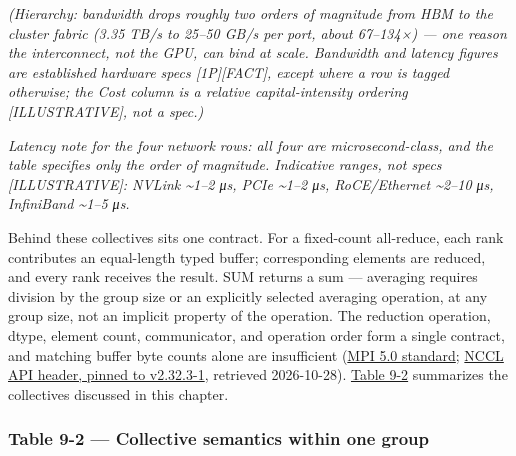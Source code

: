\emph{(Hierarchy: bandwidth drops roughly two orders of magnitude from
HBM to the cluster fabric (3.35 TB/s to 25--50 GB/s per port, about
67--134×) --- one reason the interconnect, not the GPU, can bind at
scale. Bandwidth and latency figures are established hardware specs
\mbox{{[}1P{]}}\hspace{0pt}\mbox{{[}FACT{]}}, except where a row is tagged otherwise; the Cost
column is a relative capital-intensity ordering \mbox{{[}ILLUSTRATIVE{]}}, not
a spec.)}

\emph{Latency note for the four network rows: all four are
microsecond-class, and the table specifies only the order of magnitude.
Indicative ranges, not specs \mbox{{[}ILLUSTRATIVE{]}}: NVLink
\textasciitilde1--2 μs, PCIe \textasciitilde1--2 μs, RoCE/Ethernet
\textasciitilde2--10 μs, InfiniBand \textasciitilde1--5 μs.}

Behind these collectives sits one contract. For a fixed-count
all-reduce, each rank contributes an equal-length typed buffer;
corresponding elements are reduced, and every rank receives the result.
SUM returns a sum --- averaging requires division by the group size or
an explicitly selected averaging operation, at any group size, not an
implicit property of the operation. The reduction operation, dtype,
element count, communicator, and operation order form a single contract,
and matching buffer byte counts alone are insufficient
(\href{https://www.mpi-forum.org/docs/mpi-5.0/mpi50-report.pdf}{MPI 5.0
standard};
\href{https://raw.githubusercontent.com/NVIDIA/nccl/v2.32.3-1/src/nccl.h.in}{NCCL
API header, pinned to v2.32.3-1}, retrieved 2026-10-28). \hyperref[tab:9.2]{Table 9-2}
summarizes the collectives discussed in this chapter.

\subsubsection{Table 9-2 --- Collective semantics within one
group}\label{table-9-2-collective-semantics-within-one-group}

